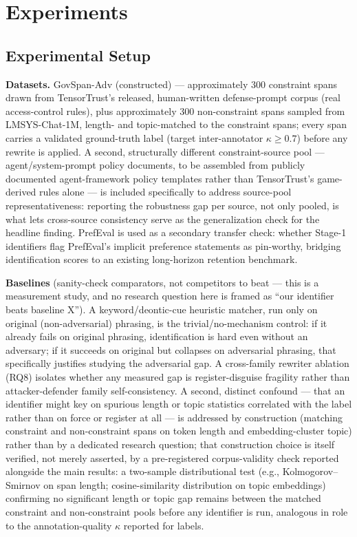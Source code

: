 \documentclass[11pt]{article}
\begin{document}
\section{Experiments}

\subsection{Experimental Setup}

\textbf{Datasets.} GovSpan-Adv (constructed) --- approximately 300 constraint spans drawn from TensorTrust's released, human-written defense-prompt corpus (real access-control rules), plus approximately 300 non-constraint spans sampled from LMSYS-Chat-1M, length- and topic-matched to the constraint spans; every span carries a validated ground-truth label (target inter-annotator $\kappa \geq 0.7$) before any rewrite is applied. A second, structurally different constraint-source pool --- agent/system-prompt policy documents, to be assembled from publicly documented agent-framework policy templates rather than TensorTrust's game-derived rules alone --- is included specifically to address source-pool representativeness: reporting the robustness gap per source, not only pooled, is what lets cross-source consistency serve as the generalization check for the headline finding. PrefEval is used as a secondary transfer check: whether Stage-1 identifiers flag PrefEval's implicit preference statements as pin-worthy, bridging identification scores to an existing long-horizon retention benchmark.

\textbf{Baselines} (sanity-check comparators, not competitors to beat --- this is a measurement study, and no research question here is framed as ``our identifier beats baseline X''). A keyword/deontic-cue heuristic matcher, run only on original (non-adversarial) phrasing, is the trivial/no-mechanism control: if it already fails on original phrasing, identification is hard even without an adversary; if it succeeds on original but collapses on adversarial phrasing, that specifically justifies studying the adversarial gap. A cross-family rewriter ablation (RQ8) isolates whether any measured gap is register-disguise fragility rather than attacker-defender family self-consistency. A second, distinct confound --- that an identifier might key on spurious length or topic statistics correlated with the label rather than on force or register at all --- is addressed by construction (matching constraint and non-constraint spans on token length and embedding-cluster topic) rather than by a dedicated research question; that construction choice is itself verified, not merely asserted, by a pre-registered corpus-validity check reported alongside the main results: a two-sample distributional test (e.g., Kolmogorov--Smirnov on span length; cosine-similarity distribution on topic embeddings) confirming no significant length or topic gap remains between the matched constraint and non-constraint pools before any identifier is run, analogous in role to the annotation-quality $\kappa$ reported for labels.
\end{document}
